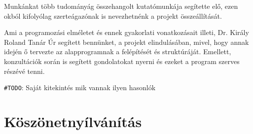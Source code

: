 \documentclass[tocnopagenum]{thesis-ekf}
\theoremstyle{definition}
\theoremstyle{remark}
\begin{document}
	Munkánkat több tudományág összehangolt kutatómunkája segítette elő, ezen okból kifolyólag szerteágazónak is nevezhetnénk a projekt összeállítását.
	
	Ami a programozási elméletet és ennek gyakorlati vonatkozásait illeti, Dr. Király Roland Tanár Úr segített bennünket, a projekt elindulásában, mivel, hogy annak idején ő tervezte az alapprogramnak a felépítését és struktúráját. Emellett, konzultációk során is segített gondolatokat nyerni és ezeket a program szerves részévé tenni.

\verb*|#TODO|: Saját kitekintés mik vannak ilyen hasonlók
	

	\chapter*{Köszönetnyílvánítás}
	
	

		\listoffigures
\end{document}
